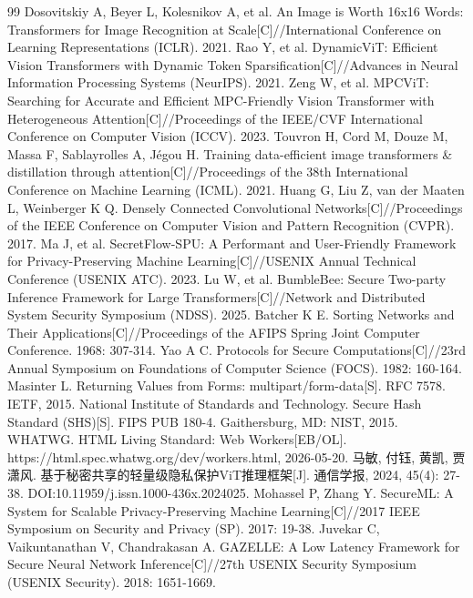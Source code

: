 \begin{thebibliography}{99}
 Dosovitskiy A, Beyer L, Kolesnikov A, et al. An Image is Worth 16x16 Words: Transformers for Image Recognition at Scale[C]//International Conference on Learning Representations (ICLR). 2021.
 Rao Y, et al. DynamicViT: Efficient Vision Transformers with Dynamic Token Sparsification[C]//Advances in Neural Information Processing Systems (NeurIPS). 2021.
 Zeng W, et al. MPCViT: Searching for Accurate and Efficient MPC-Friendly Vision Transformer with Heterogeneous Attention[C]//Proceedings of the IEEE/CVF International Conference on Computer Vision (ICCV). 2023.
 Touvron H, Cord M, Douze M, Massa F, Sablayrolles A, Jégou H. Training data-efficient image transformers \& distillation through attention[C]//Proceedings of the 38th International Conference on Machine Learning (ICML). 2021.
 Huang G, Liu Z, van der Maaten L, Weinberger K Q. Densely Connected Convolutional Networks[C]//Proceedings of the IEEE Conference on Computer Vision and Pattern Recognition (CVPR). 2017.
 Ma J, et al. SecretFlow-SPU: A Performant and User-Friendly Framework for Privacy-Preserving Machine Learning[C]//USENIX Annual Technical Conference (USENIX ATC). 2023.
 Lu W, et al. BumbleBee: Secure Two-party Inference Framework for Large Transformers[C]//Network and Distributed System Security Symposium (NDSS). 2025.
 Batcher K E. Sorting Networks and Their Applications[C]//Proceedings of the AFIPS Spring Joint Computer Conference. 1968: 307-314.
 Yao A C. Protocols for Secure Computations[C]//23rd Annual Symposium on Foundations of Computer Science (FOCS). 1982: 160-164.
 Masinter L. Returning Values from Forms: multipart/form-data[S]. RFC 7578. IETF, 2015.
 National Institute of Standards and Technology. Secure Hash Standard (SHS)[S]. FIPS PUB 180-4. Gaithersburg, MD: NIST, 2015.
 WHATWG. HTML Living Standard: Web Workers[EB/OL]. https://html.spec.whatwg.org/dev/workers.html, 2026-05-20.
 马敏, 付钰, 黄凯, 贾潇风. 基于秘密共享的轻量级隐私保护ViT推理框架[J]. 通信学报, 2024, 45(4): 27-38. DOI:10.11959/j.issn.1000-436x.2024025.
 Mohassel P, Zhang Y. SecureML: A System for Scalable Privacy-Preserving Machine Learning[C]//2017 IEEE Symposium on Security and Privacy (SP). 2017: 19-38.
 Juvekar C, Vaikuntanathan V, Chandrakasan A. GAZELLE: A Low Latency Framework for Secure Neural Network Inference[C]//27th USENIX Security Symposium (USENIX Security). 2018: 1651-1669.

\end{thebibliography}
